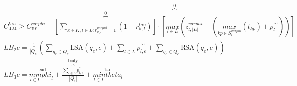 \begin{align}
  & C_{\text{TM}}^{\mathit{tau}} \geq C_{\text{RS}}^{\mathit{varphi}} - \overset{0}{\overset{︷}{\overset{0}{\overset{︷}{\left[\sum_{k \in K, l \in L : r_{k , l}^{\mathit{varphi}} = 1} \left(1 - r_{k , l}^{\mathit{tau}}\right)\right]}} \cdot \left[\underset{l \in L}{max} \left(z_{l , \left|E\right|}^{\mathit{varphi}} - \left(\underset{kp \in S_{l}^{\mathit{varphi}}}{max} \left(t_{kp}\right) + p_{l}^{' ' '}\right)\right)\right]}} \tag{eq\_0073} \\
  & \mathit{LB}_{2} e = \frac{1}{\left|Q_{e}\right|} \left(\sum_{q_{e} \in Q_{e}} \text{LSA} \left(q_{e} , e\right) + \sum_{l \in L} p_{l , e}^{' ' '} + \sum_{q_{e} \in Q_{e}} \text{RSA} \left(q_{e} , e\right)\right) \tag{eq\_0075} \\
  & \mathit{LB}_{3} e = \overset{\text{head}}{{\underset{l \in L}{min} \mathit{phi}_{l}}} + \overset{\text{body}}{\overset{︷}{\frac{\sum_{l \in L} p_{l , e}^{' ' '}}{\left|Q_{e}\right|}}} + \overset{\text{tail}}{{\underset{l \in L}{min} \mathit{theta}_{l}}} \tag{eq\_0076} \\
\end{align}
